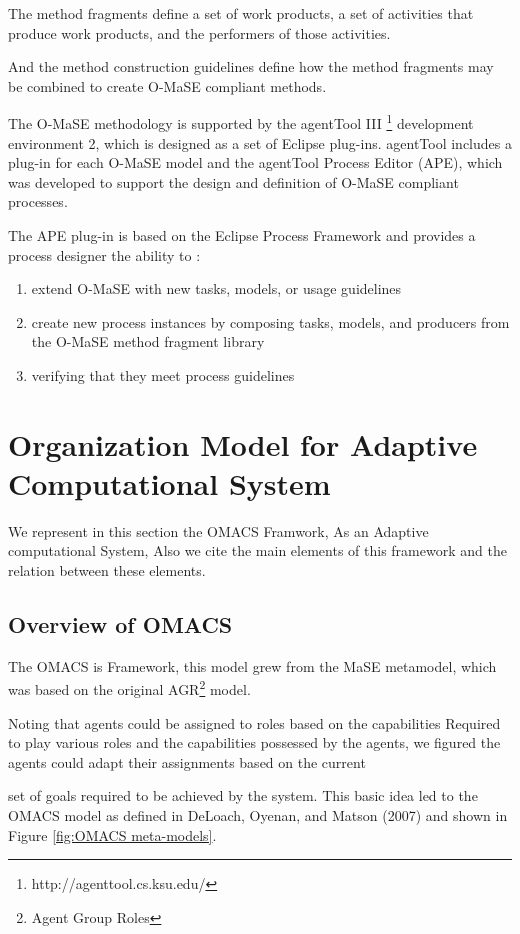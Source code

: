 The method fragments define a set of work products, a set of activities that produce work products, and the performers of those activities.

And the method construction guidelines define how the method fragments may be
combined to create O-MaSE compliant methods.

The O-MaSE methodology is supported by the agentTool III \footnote{http://agenttool.cs.ksu.edu/}
 development environment 2, 
which is designed as a set of Eclipse plug-ins. agentTool includes a plug-in for each O-MaSE model 
and the agentTool Process Editor (APE), which was developed to support the design and definition 
of O-MaSE compliant processes\cite{omacs7}.

The APE plug-in is based on the Eclipse Process Framework and provides a process designer the ability to : 
\begin{enumerate}
\item 
	extend O-MaSE with new tasks, models, or usage guidelines
\item
	create new process instances by composing tasks, models, and producers from the O-MaSE method fragment library 
\item
	 verifying that they meet process guidelines
\end{enumerate} 
 
\section{Organization Model for Adaptive Computational System}
We represent in this section the OMACS Framwork, As an Adaptive computational System, Also we cite the main elements of this framework and the relation between these elements.
\subsection{Overview of OMACS}
The OMACS is Framework, this model grew from the MaSE metamodel, 
which was based on the original AGR\footnote{Agent Group Roles} model\cite{omacs4}.
 
Noting that agents could be assigned to roles based on the capabilities 
Required to play various roles and the capabilities possessed by the agents,
we figured the agents could adapt their assignments based on the current 


set of goals required to be achieved by the system.
This basic idea led to the OMACS model as defined in DeLoach,
Oyenan, and Matson (2007) and shown in Figure \ref{fig:OMACS meta-models}\cite{omacs4}.

